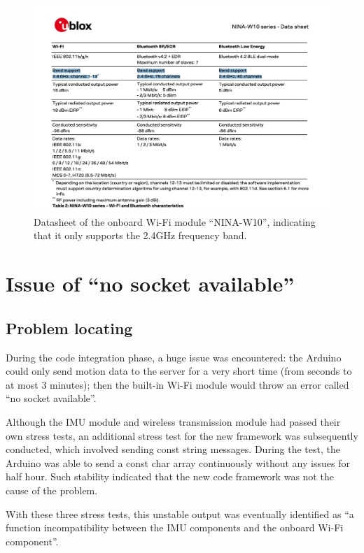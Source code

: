 \begin{figure}[htbp]
	\centering
	\includegraphics[width=\textwidth]{
		fileForWriting/wifinina}
	\caption[Datasheet of the onboard Wi-Fi module ``NINA-W10'']{Datasheet of the onboard Wi-Fi module ``NINA-W10'', indicating that it only supports the 2.4GHz frequency band.}
	\label{fig:2.4Gonly}
\end{figure}


\section{Issue of ``no socket available''}
\subsection{Problem locating}
During the code integration phase, a huge issue was encountered: the Arduino could only send motion data to the server for a very short time (from seconds to at most 3 minutes); then the built-in Wi-Fi module would throw an error called ``no socket available''.

Although the IMU module and wireless transmission module had passed their own stress tests, an additional stress test for the new framework was subsequently conducted, which involved sending const string messages.
During the test, the Arduino was able to send a const char array continuously without any issues for half hour.
Such stability indicated that the new code framework was not the cause of the problem.

With these three stress tests, this unstable output was eventually identified as ``a function incompatibility between the IMU components and the onboard Wi-Fi component''.


